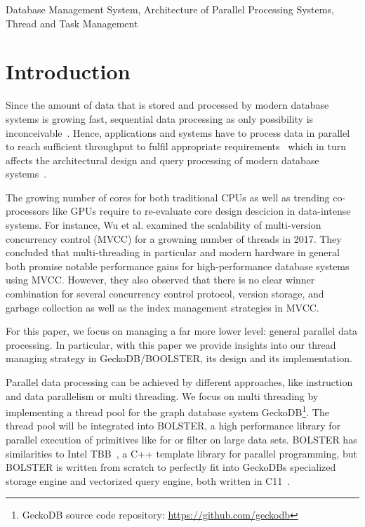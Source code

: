 \documentclass[conference]{IEEEtran}
\begin{document}
\begin{IEEEkeywords}
Database Management System, Architecture of Parallel Processing Systems, Thread and Task Management
\end{IEEEkeywords}

\section{Introduction}
Since the amount of data that is stored and processed by modern database systems is growing fast, sequential data processing as only possibility is inconceivable~\cite{Alonso:2013:HKS:2510649.2511162}. Hence, applications and systems have to process data in parallel to reach sufficient throughput to fulfil appropriate requirements~\cite{DBLP:series/synthesis/2017Ailamaki, 10.1007/978-3-319-72413-3_8, 10.5120/ijca2016912260} which in turn affects the architectural design and query processing of modern database systems~\cite{agrawal2017many, Makreshanski2017, schuh2016experimental, psaroudakis2016adaptive, psaroudakis2013task}. 

The growing number of cores for both traditional CPUs as well as trending co-processors like GPUs require to re-evaluate core design descicion in data-intense systems. For instance, Wu et al. examined the scalability of multi-version concurrency control (MVCC) for a growning number of threads in  2017\cite{wu2017empirical}. They concluded that multi-threading in particular and modern hardware in general both promise notable performance gains for high-performance database systems using MVCC. However, they also observed that there is no clear winner combination for several concurrency control protocol, version storage, and garbage collection as well as the index management strategies in MVCC. 

For this paper, we focus on managing a far more lower level: general parallel data processing. In particular, with this paper we provide insights into our thread managing strategy in GeckoDB/BOOLSTER, its design and its implementation. 

Parallel data processing can be achieved by different approaches, like instruction and data parallelism or multi threading. We focus on multi threading by implementing a thread pool for the graph database system GeckoDB\footnote{GeckoDB source code repository: \url{https://github.com/geckodb}}. The thread pool will be integrated into BOLSTER, a high performance library for parallel execution of primitives like for or filter on large data sets. BOLSTER has similarities to Intel TBB~\cite{books/daglib/0018624}, a C++ template library for parallel programming, but BOLSTER is written from scratch to perfectly fit into GeckoDBs specialized storage engine and vectorized query engine, both written in C11~\cite{pinneckegridtables}. 
\end{document}
